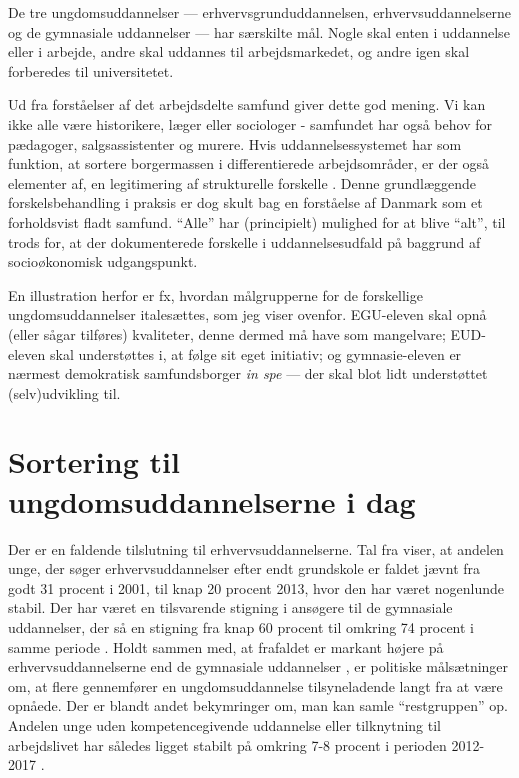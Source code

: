 De tre ungdomsuddannelser --- erhvervsgrunduddannelsen, erhvervsuddannelserne og de gymnasiale uddannelser —  har særskilte mål. Nogle skal enten i uddannelse eller i arbejde, andre skal uddannes til arbejdsmarkedet, og andre igen skal forberedes til universitetet.

Ud fra forståelser af det arbejdsdelte samfund giver dette god mening.
Vi kan ikke alle være historikere, læger eller sociologer - samfundet har også behov for pædagoger, salgsassistenter og murere.
Hvis uddannelsessystemet har som funktion, at sortere borgermassen i differentierede arbejdsområder, er der også elementer af, en legitimering af strukturelle forskelle .
Denne grundlæggende forskelsbehandling i praksis er dog skult bag en forståelse af Danmark som et forholdsvist fladt samfund.
“Alle” har (principielt) mulighed for at blive “alt”, til trods for, at der dokumenterede forskelle i uddannelsesudfald på baggrund af socioøkonomisk udgangspunkt.

En illustration herfor er fx, hvordan målgrupperne for de forskellige ungdomsuddannelser italesættes, som jeg viser ovenfor.
EGU-eleven skal opnå (eller sågar tilføres) kvaliteter, denne dermed må have som mangelvare; EUD-eleven skal understøttes i, at følge sit eget initiativ; og gymnasie-eleven er nærmest demokratisk samfundsborger \textit{in spe} — der skal blot lidt understøttet (selv)udvikling til. 

\chapter{Sortering til ungdomsuddannelserne i dag}\label{chap:sorting}

Der er en faldende tilslutning til erhvervsuddannelserne.
Tal fra \citeauthor{borne-ogundervisningsministerietSogning} viser, at andelen unge, der søger erhvervsuddannelser efter endt grundskole er faldet jævnt fra godt 31 procent i 2001, til knap 20 procent 2013, hvor den har været nogenlunde stabil.
Der har været en tilsvarende stigning i ansøgere til de gymnasiale uddannelser, der så en stigning fra knap 60 procent til omkring 74 procent i samme periode \autocite[s 5f]{undervisningsministerietOg10Klasseelevernes2017}.
Holdt sammen med, at frafaldet er markant højere på erhvervsuddannelserne end de gymnasiale uddannelser \autocite{danskegymnasierFuldforelseOgKarakterer2019}, er politiske målsætninger om, at flere gennemfører en ungdomsuddannelse tilsyneladende langt fra at være opnåede.
Der er blandt andet bekymringer om, man kan samle “restgruppen” op.
Andelen unge uden kompetencegivende uddannelse eller tilknytning til arbejdslivet har således ligget stabilt på omkring 7-8 procent i perioden 2012-2017 \autocite[s. 9]{andersenUngeUdenUddannelse2019}.

